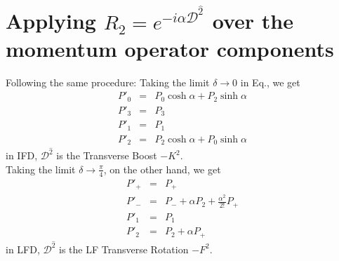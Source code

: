 \documentclass[]{article}
\numberwithin{equation}{section}
\def\bea{\begin{eqnarray}}
\def\eea{\end{eqnarray}}
\def\wh{\widehat}
\begin{document}
{\section{Applying $R_2 = e^{-i\alpha {\mathcal D}^{\wh{2}} }$ over the momentum operator components}
Following the same procedure:
Taking the limit $\delta \rightarrow 0$ in Eq., we get
\bea
\label{T3IFD}
P'_{0} & = & P_{0} \cosh{\alpha}+P_2\sinh{\alpha}
\nonumber\\ 
P'_{3} & = & {P}_{3}
\nonumber\\
P'_{1} & = & P_{1} \nonumber\\
P'_{2} & = & P_{2} \cosh{\alpha}+P_0\sinh{\alpha} \nonumber
\eea
in IFD, $\mathcal{D}^{\hat{2}}$ is the  Transverse Boost  $-K^2$.\\
%
Taking the limit $\delta \rightarrow \frac{\pi}{4}$, on the other hand, we get
\bea
\label{T3LFD}
P'_{+} & = & P_{+}
\nonumber\\ 
P'_{-} & = & P_{-}+\alpha P_2+\frac{\alpha^2}{2!}P_+
\nonumber\\
P'_{{1}} & = & {P}_{{1}} \nonumber\\
P'_{{2}} & = & {P}_{{2}}+\alpha P_{+} \nonumber
\eea
in LFD, $\mathcal{D}^{\hat{2}}$ is the LF Transverse Rotation  $-F^2$.
}
\end{document}
